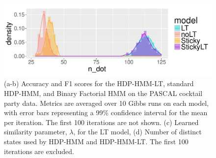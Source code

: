\begin{figure}[tb]
\begin{minipage}{0.75\textwidth}
  \includegraphics[width = \textwidth]{fig/cocktail/SSC1_s16_m12/abs_2000_n0.3_cp0/all_models/n_dot_density.pdf}
\end{minipage}
\caption{(a-b) Accuracy and F1 scores for the HDP-HMM-LT, standard HDP-HMM, and
    Binary Factorial HMM on
    the PASCAL cocktail party data.  Metrics are averaged
  over 10 Gibbs runs on each model, with error bars representing a 99\% confidence
  interval for the mean per iteration.  The first 100 iterations are
  not shown. (c) Learned similarity parameter, $\lambda$, for the LT
  model, (d) Number of distinct states used by HDP-HMM and
  HDP-HMM-LT.  The first 100 iterations are excluded.}
  \label{fig:pascal-results}
\end{figure}

